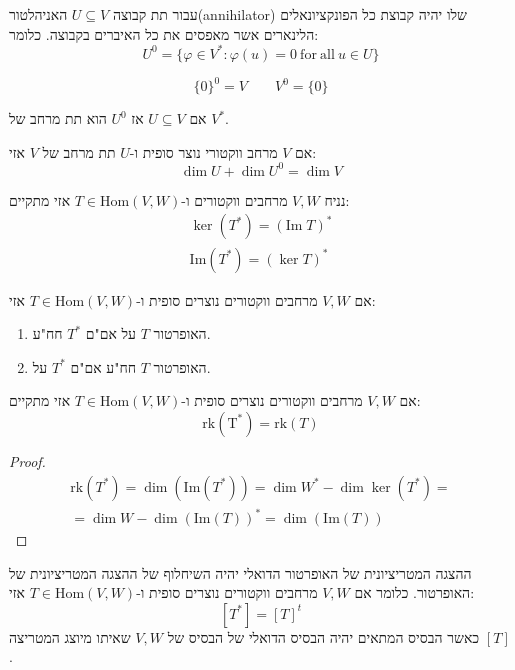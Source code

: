 \documentclass{tstextbook}
\begin{document}
\begin{definition}[אניהלטור]
עבור תת קבוצה \(U\subseteq V\) האניהלטור(annihilator) שלו יהיה קבוצת כל הפונקציונאלים הלינארים אשר מאפסים את כל האיברים בקבוצה. כלומר:
$$U^{0}=\{\varphi\in V^*:\varphi(u)=0{\mathrm{~for~all~}}u\in U\}$$

\end{definition}
\begin{example}
$$\{ 0 \}^{0}=V\quad \quad V^{0}=\{ 0 \}$$

\end{example}
\begin{proposition}
אם \(U\subseteq V\) אז \(U^{0}\) הוא תת מרחב של \(V^{*}\).

\end{proposition}
\begin{proposition}
אם \(V\) מרחב ווקטורי נוצר סופית ו-\(U\) תת מרחב של \(V\) אזי:
$$\dim U+\dim U^{0}=\dim V$$

\end{proposition}
\begin{proposition}
נניח \(V,W\) מרחבים ווקטורים ו-\(T \in \mathrm{Hom}(V,W)\) אזי מתקיים:
$$\begin{gather}\ker (T^{*})=\left( \mathrm{Im}\;T \right)^{*} \\\mathrm{Im}(T^{*})=\left( \ker T \right)^{*}
\end{gather}$$

\end{proposition}
\begin{proposition}
אם \(V,W\) מרחבים ווקטורים נוצרים סופית ו-\(T \in \mathrm{Hom}(V,W)\) אזי:

  \begin{enumerate}
    \item האופרטור \(T\) על אם"ם \(T^{*}\) חח"ע. 


    \item האופרטור \(T\) חח"ע אם"ם \(T^{*}\) על. 


  \end{enumerate}
\end{proposition}
\begin{proposition}
אם \(V,W\) מרחבים ווקטורים נוצרים סופית ו-\(T \in \mathrm{ Hom}(V,W)\) אזי מתקיים:
$$\mathrm{rk(T^{*})}=\mathrm{rk}(T)$$

\end{proposition}
\begin{proof}
$$\begin{gather}\mathrm{rk}(T^{*})=\dim \left( \mathrm{Im}(T^{*}) \right)=\dim  W^{*}-\dim  \ker (T^{*}) = \\=\dim  W - \dim \left( \mathrm{Im}(T) \right)^{*}=\dim \left( \mathrm{Im}(T) \right) 
\end{gather}$$

\end{proof}
\begin{proposition}
ההצגה המטריציונית של האופרטור הדואלי יהיה השיחלוף של ההצגה המטריציונית של האופרטור. כלומר אם \(V,W\) מרחבים ווקטורים נוצרים סופית ו-\(T \in \mathrm{Hom}(V,W)\) אזי:
$$[T^{*}]=[T]^{t}$$
כאשר הבסיס המתאים יהיה הבסיס הדואלי של הבסיס של \(V,W\) שאיתו מיוצג המטריצה \([T]\).

\end{proposition}
\end{document}
